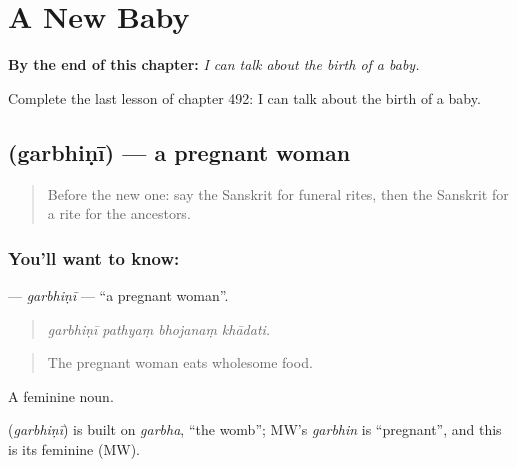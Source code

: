 
\chapter{A New Baby}
\label{ch:sa-a-new-baby}

\begin{chapteropening}
\textbf{By the end of this chapter:} \emph{I can talk about the birth of a baby.}

Complete the last lesson of chapter 492: I can talk about the birth of a baby.
\end{chapteropening}

\section[\texorpdfstring{\sk{गर्भिणी} (garbhiṇī)}{गर्भिणी (garbhiṇī)}]{ (garbhiṇī) — a pregnant woman}

\label{lesson:SA-C492-garbhini}



\begin{quote}
Before the new one: say the Sanskrit for funeral rites, then the Sanskrit for a rite for the ancestors.
\end{quote}

\subsection*{You'll want to know: }
\textbf{} — \emph{garbhiṇī} — \textquotedblleft{}a pregnant woman\textquotedblright{}.

\begin{quote}
   
\end{quote}

\begin{quote}
\emph{garbhiṇī pathyaṃ bhojanaṃ khādati.}
\end{quote}

\begin{quote}
The pregnant woman eats wholesome food.
\end{quote}

A feminine noun.

\begin{cousinweb}
\textbf{} (\emph{garbhiṇī}) is built on \emph{garbha}, \textquotedblleft{}the womb\textquotedblright{}; MW's \emph{garbhin} is \textquotedblleft{}pregnant\textquotedblright{}, and this is its feminine (MW).
\end{cousinweb}

